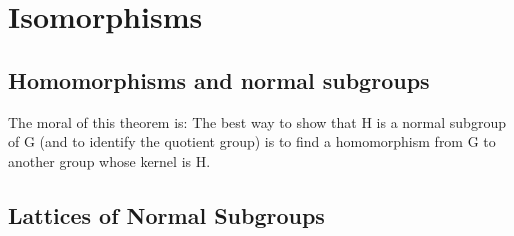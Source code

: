 
\chapter{Isomorphisms}




\section{Homomorphisms and normal subgroups}






The moral of this theorem is: 
The best way to show that H is a normal subgroup
of G (and to identify the quotient group) is to ﬁnd a homomorphism from G to another
group whose kernel is H.



\section{Lattices of Normal Subgroups}


